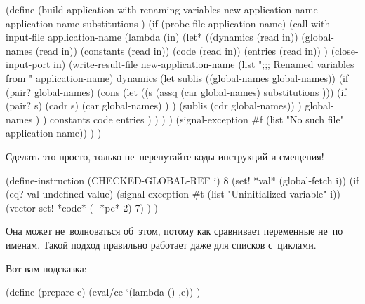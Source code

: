 \begin{code:lisp}
(define (build-application-with-renaming-variables
         new-application-name application-name substitutions )
  (if (probe-file application-name)
      (call-with-input-file application-name
        (lambda (in)
          (let* ((dynamics     (read in))
                 (global-names (read in))
                 (constants    (read in))
                 (code         (read in))
                 (entries      (read in)) )
            (close-input-port in)
            (write-result-file
             new-application-name
             (list ";;; Renamed variables from " application-name)
             dynamics
             (let sublis ((global-names global-names))
               (if (pair? global-names)
                   (cons (let ((s (assq (car global-names)
                                        substitutions )))
                           (if (pair? s)
                               (cadr s)
                               (car global-names) ) )
                         (sublis (cdr global-names)) )
                   global-names ) )
             constants
             code
             entries ) ) ) )
      (signal-exception #f (list "No such file" application-name)) ) )
\end{code:lisp}



Сделать это просто, только не~перепутайте коды инструкций и смещения!

\begin{code:lisp}
(define-instruction (CHECKED-GLOBAL-REF i) 8
  (set! *val* (global-fetch i))
  (if (eq? val undefined-value)
      (signal-exception #t (list "Uninitialized variable" i))
      (vector-set! *code* (- *pc* 2) 7) ) )
\end{code:lisp}




Она может не~волноваться об~этом, потому как сравнивает переменные не~по именам.
Такой подход правильно работает даже для списков с~циклами.



Вот вам подсказка:

\begin{code:lisp}
(define (prepare e)
  (eval/ce `(lambda () ,e)) )
\end{code:lisp}



